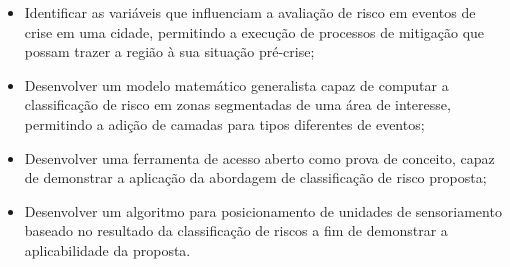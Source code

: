 \begin{refsection}
\begin{itemize}
  \item Identificar as variáveis que influenciam a avaliação de risco em eventos de crise em uma cidade, permitindo a execução de processos de mitigação que possam trazer a região à sua situação pré-crise;
  \item Desenvolver um modelo matemático generalista capaz de computar a classificação de risco em zonas segmentadas de uma área de interesse, permitindo a adição de camadas para tipos diferentes de eventos;
  \item Desenvolver uma ferramenta de acesso aberto como prova de conceito, capaz de demonstrar a aplicação da abordagem de classificação de risco proposta;
  \item Desenvolver um algoritmo para posicionamento de unidades de sensoriamento baseado no resultado da classificação de riscos a fim de demonstrar a aplicabilidade da proposta.
\end{itemize}


\end{refsection}
